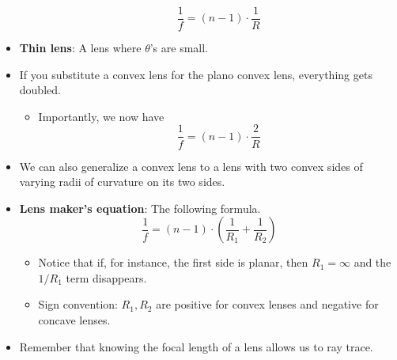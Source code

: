 \documentclass[../notes.tex]{subfiles}
\begin{document}
\begin{itemize}
\begin{itemize}
\begin{equation*}
            \frac{1}{f} = (n-1)\cdot\frac{1}{R}
        \end{equation*}
    \end{itemize}
    \item \textbf{Thin lens}: A lens where $\theta$'s are small.
    \item If you substitute a convex lens for the plano convex lens, everything gets doubled.
    \begin{itemize}
        \item Importantly, we now have
        \begin{equation*}
            \frac{1}{f} = (n-1)\cdot\frac{2}{R}
        \end{equation*}
    \end{itemize}
    \item We can also generalize a convex lens to a lens with two convex sides of varying radii of curvature on its two sides.
    \item \textbf{Lens maker's equation}: The following formula.
    \begin{equation*}
        \frac{1}{f} = (n-1)\cdot\left( \frac{1}{R_1}+\frac{1}{R_2} \right)
    \end{equation*}
    \begin{itemize}
        \item Notice that if, for instance, the first side is planar, then $R_1=\infty$ and the $1/R_1$ term disappears.
        \item Sign convention: $R_1,R_2$ are positive for convex lenses and negative for concave lenses.
    \end{itemize}
    \item Remember that knowing the focal length of a lens allows us to ray trace.
    \begin{figure}[h!]
        \centering
\end{figure}
\end{itemize}
\end{document}

